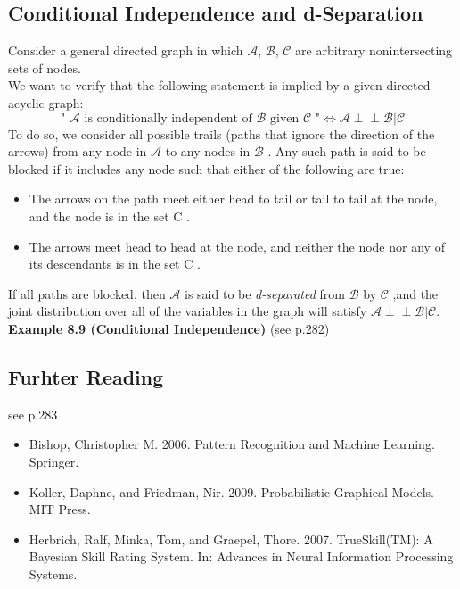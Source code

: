 \subsection{Conditional Independence and d-Separation}
Consider a general directed graph in which $\mathcal{A}$, $\mathcal{B}$, $\mathcal{C}$ are arbitrary nonintersecting sets of nodes.\\
We want to verify that the following statement is implied by a given directed acyclic graph:
\[
\text{" } \mathcal{A} \text{ is conditionally independent of } \mathcal{B} \text{ given } \mathcal{C} \text{ "} \Leftrightarrow \mathcal{A} \perp\!\perp \mathcal{B} | \mathcal{C} \tag{8.34}
\]
To do so, we consider all possible trails (paths that ignore the direction of the arrows) from any node in $\mathcal{A}$ to any nodes in $\mathcal{B}$ . Any such path is said to be blocked if it includes any node such that either of the following are true:
\begin{itemize}
	\item The arrows on the path meet either head to tail or tail to tail at the node, and the node is in the set C .
	\item The arrows meet head to head at the node, and neither the node nor any of its descendants is in the set C .
\end{itemize}
If all paths are blocked, then $\mathcal{A}$ is said to be \textit{d-separated} from $\mathcal{B}$ by $\mathcal{C}$ ,and the joint distribution over all of the variables in the graph will satisfy $\mathcal{A} \perp\!\perp \mathcal{B} | \mathcal{C}$. \\ 
\textbf{Example 8.9 (Conditional Independence)} (see p.282) \\
\subsection{Furhter Reading} 
see p.283 \\
\begin{itemize}
	\item Bishop, Christopher M. 2006. Pattern Recognition and Machine Learning. Springer.
	\item Koller, Daphne, and Friedman, Nir. 2009. Probabilistic Graphical Models. MIT Press.
	\item Herbrich, Ralf, Minka, Tom, and Graepel, Thore. 2007. TrueSkill(TM): A Bayesian Skill Rating System. In: Advances in Neural Information Processing Systems.
\end{itemize}

